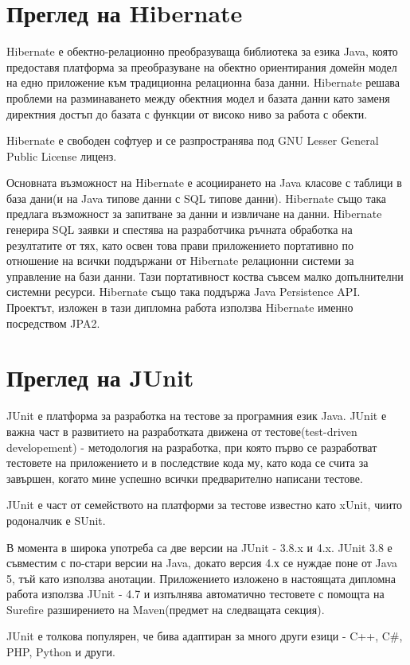 \section{Преглед на Hibernate}
Hibernate е обектно-релационно преобразуваща библиотека за езика Java,
която предоставя платформа за преобразуване на обектно ориентирания
домейн модел на едно приложение към традиционна релационна база
данни. Hibernate решава проблеми на разминаването между обектния модел
и базата данни като заменя директния достъп до базата с функции от
високо ниво за работа с обекти.

Hibernate е свободен софтуер и се разпространява под GNU Lesser
General Public License лиценз.

Основната възможност на Hibernate е асоциирането на Java класове с
таблици в база дани(и на Java типове данни с SQL типове
данни). Hibernate също така предлага възможност за запитване за данни
и извличане на данни. Hibernate генерира SQL заявки и спестява на
разработчика ръчната обработка на резултатите от тях, като освен това
прави приложението портативно по отношение на всички поддържани от
Hibernate релационни системи за управление на бази данни. Тази
портативност коства съвсем малко допълнителни системни
ресурси. Hibernate също така поддържа Java Persistence API. Проектът,
изложен в тази дипломна работа използва Hibernate именно посредством
JPA2.
\section{Преглед на JUnit}
JUnit е платформа за разработка на тестове за програмния език
Java. JUnit е важна част в развитието на разработката движена от
тестове(test-driven developement) - методология на разработка, при
която първо се разработват тестовете на приложението и в последствие
кода му, като кода се счита за завършен, когато мине успешно всички
предварително написани тестове. 

JUnit е част от семейството на платформи за тестове известно като
xUnit, чиито родоналчик е SUnit.

В момента в широка употреба са две версии на JUnit - 3.8.x и
4.x. JUnit 3.8 е съвместим с по-стари версии на Java, докато версия
4.х се нуждае поне от Java 5, тъй като използва анотации. Приложението
изложено в настоящата дипломна работа използва JUnit - 4.7 и изпълнява
автоматично тестовете с помощта на Surefire разширението на
Maven(предмет на следващата секция).

JUnit е толкова популярен, че бива адаптиран за много други езици -
C++, C\#, PHP, Python и други.
